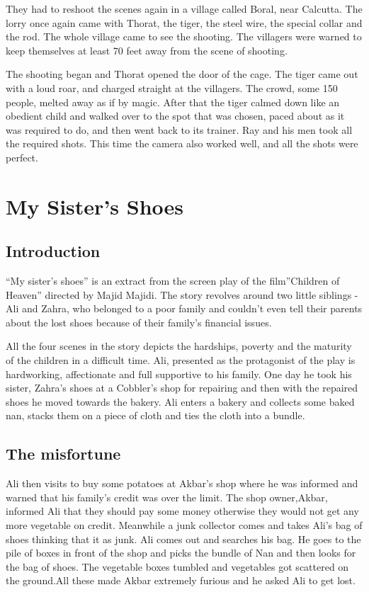 \documentclass[a4paper,12pt]{book}
\begin{document}
They had to reshoot the scenes again in a village called Boral, near Calcutta. The lorry once again came with Thorat, the tiger, the steel wire, the special collar and the rod. The whole village came to see the shooting. The villagers were warned to keep themselves at least 70 feet away from the scene of shooting.

The shooting began and Thorat opened the door of the cage. The tiger came out with a loud roar, and charged straight at the villagers. The crowd, some 150 people, melted away as if by magic. After that the tiger calmed down like an obedient child and walked over to the spot that was chosen, paced about as it was required to do, and then went back to its trainer. Ray and his men took all the required shots. This time the camera also worked well, and all the shots were perfect.

\chapter{My Sister’s Shoes}
\label{sec:org03e334a}

\section{Introduction}
\label{sec:org201d1f7}

“My sister’s shoes” is an extract from the screen play of the film”Children of Heaven” directed by Majid Majidi. The story revolves around two little siblings -Ali and Zahra, who belonged to a poor family and couldn’t even tell their parents about the lost shoes because of their family’s financial issues.

All the four scenes in the story depicts the hardships, poverty and the maturity of the children in a difficult time. Ali, presented as the protagonist of the play is hardworking, affectionate and full supportive to his family. One day he took his sister, Zahra’s shoes at a Cobbler’s shop for repairing and then with the repaired shoes he moved towards the bakery. Ali enters a bakery and collects some baked nan, stacks them on a piece of cloth and ties the cloth into a bundle.

\section{The misfortune}
\label{sec:org0143193}

Ali then visits to buy some potatoes at Akbar’s shop where he was informed and warned that his family’s credit was over the limit. The shop owner,Akbar, informed Ali that they should pay some money otherwise they would not get any more vegetable on credit. Meanwhile a junk collector comes and takes Ali’s bag of shoes thinking that it as junk. Ali comes out and searches his bag. He goes to the pile of boxes in front of the shop and picks the bundle of Nan and then looks for the bag of shoes. The vegetable boxes tumbled and vegetables got scattered on the ground.All these made Akbar extremely furious and he asked Ali to get lost.
\end{document}
